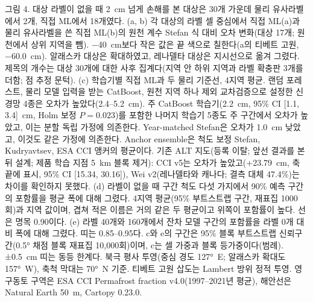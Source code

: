 \medskip

\noindent 그림 4. 대상 라벨이 없을 때 2~cm 넘게 손해를 본 대상은 30개 가운데 물리 유사라벨에서 2개, 직접 ML에서 18개였다.
(a, b) 각 대상의 라벨 셀 중심에서 직접 ML(a)과 물리 유사라벨을 쓴 직접 ML(b)의 원천 계수 Stefan 식 대비 오차 변화(대상 17개; 원천에서 상위 지역을 뺌).
−40~cm보다 작은 값은 끝 색으로 칠한다(a의 티베트 고원, −60.0~cm).
알래스카 대상은 확대하였고, 레나델타 대상은 지시선으로 옮겨 그렸다.
제목의 개수는 대상 30개에 대한 사후 집계다(지역 안 하위 지역과 라벨 확충판 3개를 더함; 점 추정 문턱).
(c) 학습기별 직접 ML과 두 물리 기준선, 4지역 평균.
랜덤 포레스트, 물리 모델 입력을 받는 CatBoost, 원천 지역 하나 제외 교차검증으로 설정한 신경망 4종은 오차가 높았다(2.4--5.2~cm).
주 CatBoost 학습기(2.2~cm, 95\% CI [1.1, 3.4]~cm, Holm 보정 $P = 0.023$)를 포함한 나머지 학습기 5종도 주 구간에서 오차가 높았고, 이는 분할 독립 가정에 의존한다.
Year-matched Stefan은 오차가 1.0~cm 낮았고, 이것도 같은 가정에 의존한다.
Anchor ensemble은 척도 보정 Stefan, Kudryavtsev, ESA CCI 앵커의 평균이다.
기존 ALT 지도(등록 이탈; 앞선 결과를 본 뒤 설계; 제품 학습 지점 5~km 블록 제거): CCI v5는 오차가 높았고(+23.79~cm, 축 끝에 표시, 95\% CI [15.34, 30.16]), Wei v2(레나델타와 캐나다; 결측 대체 47.4\%)는 차이를 확인하지 못했다.
(d) 라벨이 없을 때 구간 척도 다섯 가지에서 90\% 예측 구간의 포함률을 평균 폭에 대해 그렸다. 4지역 평균(95\% 부트스트랩 구간, 재표집 1000회)과 지역 값이며, 겹쳐 적은 이름은 거의 같은 두 평균이고 위쪽이 포함률이 높다. 선은 명목 0.90이다.
(e) 라벨 40개와 160개에서 잔차 모델 구간의 포함률을 라벨 0개 대비 폭에 대해 그렸다. 띠는 0.85--0.95다.
c와 e의 구간은 95\% 블록 부트스트랩 신뢰구간(0.5° 채점 블록 재표집 10,000회)이며, c는 셀 가중과 블록 등가중이다(범례). ±0.5~cm 띠는 동등 한계다.
북극 평사 투영(중심 경도 127°~E; 알래스카 확대도 157°~W), 축척 막대는 70°~N 기준. 티베트 고원 삽도는 Lambert 방위 정적 투영.
영구동토 구역은 ESA CCI Permafrost fraction v4.0(1997--2021년 평균), 해안선은 Natural Earth 50~m, Cartopy 0.23.0.

\medskip

